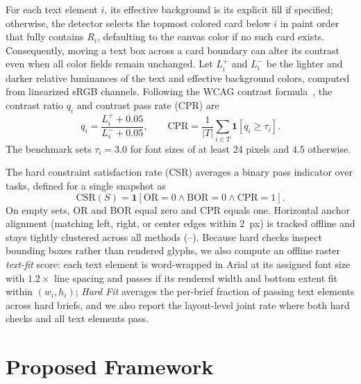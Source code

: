 For each text element \(i\), its effective background is its explicit fill if
specified; otherwise, the detector selects the topmost colored card below \(i\)
in paint order that fully contains \(R_i\), defaulting to the canvas color if no
such card exists. Consequently, moving a text box across a card boundary can
alter its contrast even when all color fields remain unchanged. Let \(L_i^+\)
and \(L_i^-\) be the lighter and darker relative luminances of the text and
effective background colors, computed from linearized sRGB channels. Following
the WCAG contrast formula~\cite{wcag21}, the contrast ratio \(q_i\) and contrast
pass rate (CPR) are
\begin{equation}
 q_i=\frac{L_i^+ + 0.05}{L_i^- + 0.05}, \qquad
 \mathrm{CPR}=\frac{1}{|T|}\sum_{i\in T}\mathbf{1}[q_i\geq\tau_i].
 \label{eq:contrast}
\end{equation}
The benchmark sets \(\tau_i=3.0\) for font sizes of at least 24 pixels and
\(4.5\) otherwise.

The hard constraint satisfaction rate (CSR) averages a binary pass indicator
over tasks, defined for a single snapshot as
\begin{equation}
 \mathrm{CSR}(S)=\mathbf{1}[\mathrm{OR}=0 \land
                         \mathrm{BOR}=0 \land \mathrm{CPR}=1].
 \label{eq:satisfaction}
\end{equation}
On empty sets, OR and BOR equal zero and CPR equals one. Horizontal anchor
alignment (matching left, right, or center edges within 2~px) is tracked offline
and stays tightly clustered across all methods (\vASMin--\vASMax{}). Because
hard checks inspect bounding boxes rather than rendered glyphs, we also compute
an offline raster \emph{text-fit} score: each text element is word-wrapped in
Arial at its assigned font size with $1.2\times$ line spacing and passes if its
rendered width and bottom extent fit within \((w_i,h_i)\); \emph{Hard Fit}
averages the per-brief fraction of passing text elements across hard briefs, and
we also report the layout-level joint rate where both hard checks and all text
elements pass.



\section{Proposed Framework}
\label{sec:framework}

